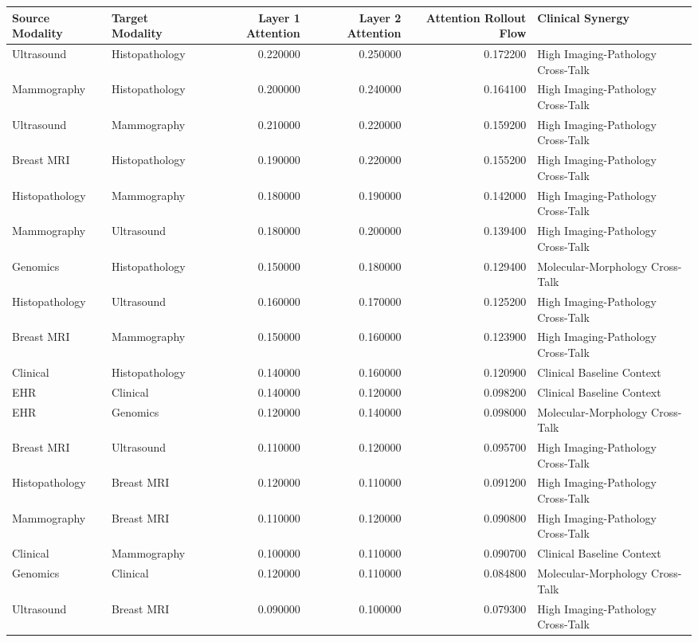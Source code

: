 \begin{tabular}{llrrrl}
\toprule
Source Modality & Target Modality & Layer 1 Attention & Layer 2 Attention & Attention Rollout Flow & Clinical Synergy \\
\midrule
Ultrasound & Histopathology & 0.220000 & 0.250000 & 0.172200 & High Imaging-Pathology Cross-Talk \\
Mammography & Histopathology & 0.200000 & 0.240000 & 0.164100 & High Imaging-Pathology Cross-Talk \\
Ultrasound & Mammography & 0.210000 & 0.220000 & 0.159200 & High Imaging-Pathology Cross-Talk \\
Breast MRI & Histopathology & 0.190000 & 0.220000 & 0.155200 & High Imaging-Pathology Cross-Talk \\
Histopathology & Mammography & 0.180000 & 0.190000 & 0.142000 & High Imaging-Pathology Cross-Talk \\
Mammography & Ultrasound & 0.180000 & 0.200000 & 0.139400 & High Imaging-Pathology Cross-Talk \\
Genomics & Histopathology & 0.150000 & 0.180000 & 0.129400 & Molecular-Morphology Cross-Talk \\
Histopathology & Ultrasound & 0.160000 & 0.170000 & 0.125200 & High Imaging-Pathology Cross-Talk \\
Breast MRI & Mammography & 0.150000 & 0.160000 & 0.123900 & High Imaging-Pathology Cross-Talk \\
Clinical & Histopathology & 0.140000 & 0.160000 & 0.120900 & Clinical Baseline Context \\
EHR & Clinical & 0.140000 & 0.120000 & 0.098200 & Clinical Baseline Context \\
EHR & Genomics & 0.120000 & 0.140000 & 0.098000 & Molecular-Morphology Cross-Talk \\
Breast MRI & Ultrasound & 0.110000 & 0.120000 & 0.095700 & High Imaging-Pathology Cross-Talk \\
Histopathology & Breast MRI & 0.120000 & 0.110000 & 0.091200 & High Imaging-Pathology Cross-Talk \\
Mammography & Breast MRI & 0.110000 & 0.120000 & 0.090800 & High Imaging-Pathology Cross-Talk \\
Clinical & Mammography & 0.100000 & 0.110000 & 0.090700 & Clinical Baseline Context \\
Genomics & Clinical & 0.120000 & 0.110000 & 0.084800 & Molecular-Morphology Cross-Talk \\
Ultrasound & Breast MRI & 0.090000 & 0.100000 & 0.079300 & High Imaging-Pathology Cross-Talk \\

\end{tabular}
